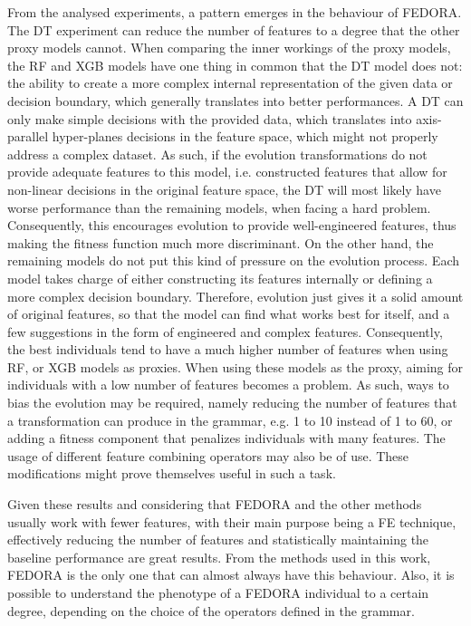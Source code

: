 From the analysed experiments, a pattern emerges in the behaviour of FEDORA. The \gls{DT} experiment can reduce the number of features to a degree that the other proxy models cannot. When comparing the inner workings of the proxy models, the \gls{RF} and \gls{XGB} models have one thing in common that the \gls{DT} model does not: the ability to create a more complex internal representation of the given data or decision boundary, which generally translates into better performances. A \gls{DT} can only make simple decisions with the provided data, which translates into axis-parallel hyper-planes decisions in the feature space, which might not properly address a complex dataset. As such, if the evolution transformations do not provide adequate features to this model, i.e. constructed features that allow for non-linear decisions in the original feature space, the \gls{DT} will most likely have worse performance than the remaining models, when facing a hard problem. Consequently, this encourages evolution to provide well-engineered features, thus making the fitness function much more discriminant. On the other hand, the remaining models do not put this kind of pressure on the evolution process. Each model takes charge of either constructing its features internally or defining a more complex decision boundary. Therefore, evolution just gives it a solid amount of original features, so that the model can find what works best for itself, and a few suggestions in the form of engineered and complex features. Consequently, the best individuals tend to have a much higher number of features when using \gls{RF}, or \gls{XGB} models as proxies. When using these models as the proxy, aiming for individuals with a low number of features becomes a problem. As such, ways to bias the evolution may be required, namely reducing the number of features that a transformation can produce in the grammar, e.g. 1 to 10 instead of 1 to 60, or adding a fitness component that penalizes individuals with many features. The usage of different feature combining operators may also be of use. These modifications might prove themselves useful in such a task.

Given these results and considering that FEDORA and the other methods usually work with fewer features, with their main purpose being a \gls{FE} technique, effectively reducing the number of features and statistically maintaining the baseline performance are great results. From the methods used in this work, FEDORA is the only one that can almost always have this behaviour. Also, it is possible to understand the phenotype of a FEDORA individual to a certain degree, depending on the choice of the operators defined in the grammar.



